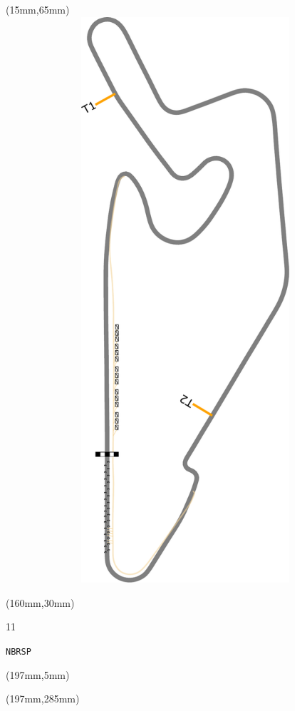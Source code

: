 \begin{textblock*}{185mm}(15mm,65mm)%
\centering
\mbox{\includegraphics[width=185mm,height=210mm,keepaspectratio]{PT/NBRSP.pdf}}
\end{textblock*}
\begin{textblock*}{40mm}(160mm,30mm)%
\Large
\par{} 
\par11 
\par\hfill\tiny\tt NBRSP\\
\end{textblock*}
\begin{textblock*}{20mm}(197mm,5mm)%
\fbox{\thepage}
\label{NBRSP}
\end{textblock*}
\begin{textblock*}{20mm}(197mm,285mm)%
\fbox{\thepage}
\end{textblock*}

